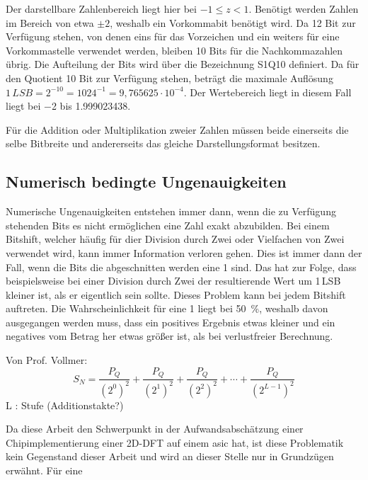 Der darstellbare Zahlenbereich liegt hier bei $-1\leq z < 1$. Benötigt werden Zahlen im Bereich von etwa $\pm2$, weshalb ein Vorkommabit benötigt wird. 
Da 12 Bit zur Verfügung stehen, von denen eins für das Vorzeichen und ein weiters für eine Vorkommastelle verwendet werden, bleiben 10 Bits für die Nachkommazahlen übrig.
Die Aufteilung der Bits wird über die Bezeichnung S1Q10 definiert.
Da für den Quotient 10 Bit zur Verfügung stehen, beträgt die maximale Auflösung $1\,LSB = 2^{-10} = {1024}^{-1} = 9,765625\cdot10^{-4}$.
Der Wertebereich liegt in diesem Fall liegt bei \num{-2} bis \num{1,999023438}. 

Für die Addition oder Multiplikation zweier Zahlen müssen beide einerseits die selbe Bitbreite und andererseits das gleiche Darstellungsformat besitzen.



 
\subsection{Numerisch bedingte Ungenauigkeiten}\label{sec:NumerischeUngenauigkeiten}
Numerische Ungenauigkeiten entstehen immer dann, wenn die zu Verfügung stehenden Bits es nicht ermöglichen eine Zahl exakt abzubilden. 
Bei einem Bitshift, welcher häufig für dier Division durch Zwei oder Vielfachen von Zwei verwendet wird, kann immer Information verloren gehen. Dies ist immer dann der Fall,
wenn die Bits die abgeschnitten werden eine 1 sind. Das hat zur Folge, dass beispielsweise
bei einer Division durch Zwei der resultierende Wert um 1\,LSB kleiner ist, als er eigentlich sein sollte. 
Dieses Problem kann bei jedem Bitshift auftreten. Die Wahrscheinlichkeit für eine 1 liegt bei \SI{50}{\percent}, weshalb davon ausgegangen werden muss, dass ein positives Ergebnis etwas 
kleiner und ein negatives vom Betrag her etwas größer ist, als bei verlustfreier Berechnung. 


Von Prof. Vollmer: 
\begin{equation}
 S_N = \frac{P_Q}{\left(2^0\right)^2} + \dfrac{P_Q}{\left(2^1\right)^2} + \dfrac{P_Q}{\left(2^2\right)^2} + \cdots + \dfrac{P_Q}{\left(2^{L-1}\right)^2}
\end{equation}
L : Stufe (Additionstakte?)

Da diese Arbeit den Schwerpunkt in der Aufwandsabschätzung einer Chipimplementierung einer 2D-DFT auf einem \gls{asic} hat, ist diese Problematik kein Gegenstand dieser Arbeit und
wird an dieser Stelle nur in Grundzügen erwähnt. Für eine 

